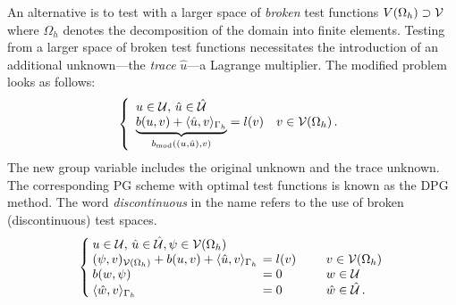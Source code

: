 An alternative is to test with a larger space of {\em broken} test functions $V(\Omega_h) \supset \mathcal{V}$ where $\Omega_h$ denotes the 
decomposition of the domain into finite elements. Testing from a larger space of broken test functions necessitates the introduction of an 
additional unknown---the {\em trace} $\hat{u}$---a Lagrange multiplier. The modified problem looks as follows:
\[
\left\{
\begin{array}{llllll}
u \in \mathcal{U} ,\, \hat{u} \in \hat{\mathcal{U}} \\
\underbrace{b(u,v) + \langle \hat{u}, v \rangle_{\Gamma_h}}_{b_{\text{mod}}((u,\hat{u}),v)} = l(v) \quad v \in \mathcal{V}(\Omega_h)\, .
\end{array}
\right.
\]
The new group variable includes the original unknown and the trace unknown. The corresponding PG scheme with optimal test functions is known as the DPG method. The word {\em discontinuous} in the name refers to the use of broken (discontinuous) test spaces.
\[
\arraycolsep=2pt
\left\{
\begin{array}{llllll}
u \in \trial ,\, \hat{u} \in \hat{\trial}, \psi \in \test(\Omega_h) \\
(\psi,v)_{\test(\Omega_h)} + b(u,v) + \langle \hat{u}, v \rangle_{\Gamma_h} & = l(v) \quad &\quad v \in \test(\Omega_h)\\
b(w, \psi) & = 0 &\quad w \in \trial\\
\lb \hat{w}, v \rb_{\Gamma_h} & = 0 &\quad \hat{w} \in \hat{\trial} \, .
\end{array}
\right.
\]

